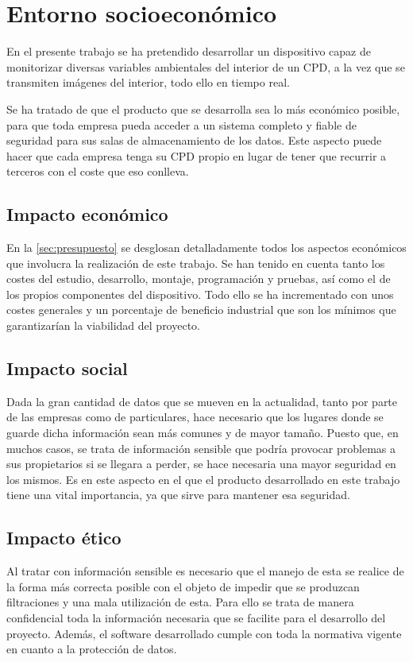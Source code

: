 \chapter{Entorno socioeconómico}\label{ch:entornoSocioEconomico}
En el presente trabajo se ha pretendido desarrollar un dispositivo capaz de monitorizar diversas variables ambientales del interior de un CPD, a la vez que se transmiten imágenes del interior, todo ello en tiempo real.

Se ha tratado de que el producto que se desarrolla sea lo más económico posible, para que toda empresa pueda acceder a un sistema completo y fiable de seguridad para sus salas de almacenamiento de los datos. Este aspecto puede hacer que cada empresa tenga su CPD propio en lugar de tener que recurrir a terceros con el coste que eso conlleva.

\section{Impacto económico}\label{sec:impacto-económico}
En la \autoref{sec:presupuesto} se desglosan detalladamente todos los aspectos económicos que involucra la realización de este trabajo. Se han tenido en cuenta tanto los costes del estudio, desarrollo, montaje, programación y pruebas, así como el de los propios componentes del dispositivo. Todo ello se ha incrementado con unos costes generales y un porcentaje de beneficio industrial que son los mínimos que garantizarían la viabilidad del proyecto.

\section{Impacto social}\label{sec:impacto-social}
Dada la gran cantidad de datos que se mueven en la actualidad, tanto por parte de las empresas como de particulares, hace necesario que los lugares donde se guarde dicha información sean más comunes y de mayor tamaño. Puesto que, en muchos casos, se trata de información sensible que podría provocar problemas a sus propietarios si se llegara a perder, se hace necesaria una mayor seguridad en los mismos. Es en este aspecto en el que el producto desarrollado en este trabajo tiene una vital importancia, ya que sirve para mantener esa seguridad.

\section{Impacto ético}\label{sec:impacto-ético}
Al tratar con información sensible es necesario que el manejo de esta se realice de la forma más correcta posible con el objeto de impedir que se produzcan filtraciones y una mala utilización de esta. Para ello se trata de manera confidencial toda la información necesaria que se facilite para el desarrollo del proyecto. Además, el software desarrollado cumple con toda la normativa vigente en cuanto a la protección de datos.

